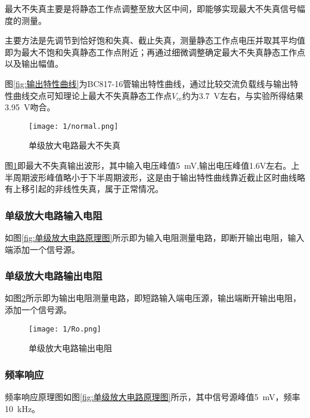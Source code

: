 最大不失真主要是将静态工作点调整至放大区中间，即能够实现最大不失真信号幅度的测量。

主要方法是先调节到恰好饱和失真、截止失真，测量静态工作点电压并取其平均值即为最大不饱和失真静态工作点附近；再通过细微调整确定最大不失真静态工作点以及输出幅值。

图\ref{fig:输出特性曲线}为BC817-16管输出特性曲线，通过比较交流负载线与输出特性曲线交点可知理论上最大不失真静态工作点$ V_\mathrm{ce} $约为\SI{3.7}{\V}左右，与实验所得结果\SI{3.95}{\V}吻合。

\begin{figure}[H]
	\centering
	\texttt{[image: 1/normal.png]}
	\caption{单级放大电路最大不失真}
	\label{fig:单级放大电路最大不失真}
\end{figure}

图\ref{fig:单级放大电路最大不失真}即最大不失真输出波形，其中输入电压峰值\SI{5}{\mV},输出电压峰值1.6V左右。上半周期波形峰值略小于下半周期波形，这是由于输出特性曲线靠近截止区时曲线略有上移引起的非线性失真，属于正常情况。

\subsubsection{单级放大电路输入电阻}%
\label{ssub:单级放大电路输入电阻}

如图\ref{fig:单级放大电路原理图}所示即为输入电阻测量电路，即断开输出电阻，输入端添加一个信号源。

\subsubsection{单级放大电路输出电阻}%
\label{ssub:单级放大电路输出电阻}

如图\ref{fig:单级放大电路输出电阻}所示即为输出电阻测量电路，即短路输入端电压源，输出端断开输出电阻，添加一个信号源。

\begin{figure}[H]
	\centering
	\texttt{[image: 1/Ro.png]}
	\caption{单级放大电路输出电阻}
	\label{fig:单级放大电路输出电阻}
\end{figure}

\subsubsection{频率响应}%
\label{ssub:频率响应}

频率响应原理图如图\ref{fig:单级放大电路原理图}所示，其中信号源峰值\SI{5}{\mV}，频率\SI{10}{\kHz}。

